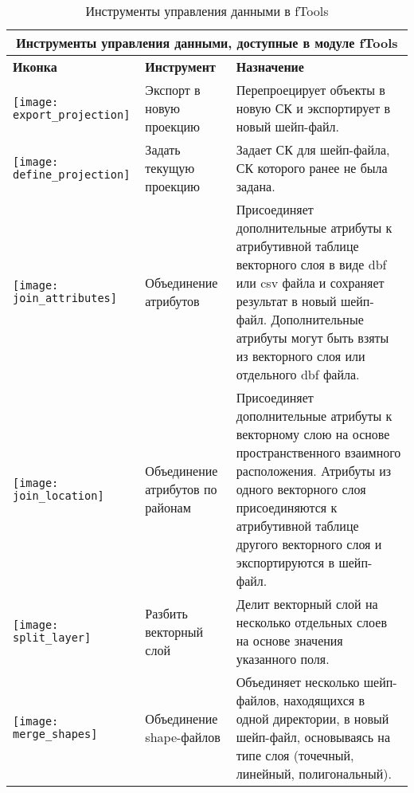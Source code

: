 \begin{table}[ht]
\centering
\begin{tabular}{|m{1cm}|m{3cm}|m{9cm}|}
 \hline \multicolumn{3}{|c|}{\textbf{Инструменты управления данными, доступные в модуле fTools}} \\
 \hline \textbf{Иконка} & \textbf{Инструмент} & \textbf{Назначение} \\
 \hline \texttt{[image: export\_projection]} & Экспорт в новую проекцию &
 Перепроецирует объекты в новую СК и экспортирует в новый шейп-файл. \\
 \hline \texttt{[image: define\_projection]} & Задать текущую проекцию &
 Задает СК для шейп-файла, СК которого ранее не была задана. \\
 \hline \texttt{[image: join\_attributes]} & Объединение атрибутов & Присоединяет
 дополнительные атрибуты к атрибутивной таблице векторного слоя в виде dbf или csv файла и
 сохраняет результат в новый шейп-файл. Дополнительные атрибуты могут быть взяты из
 векторного слоя или отдельного dbf файла. \\
 \hline \texttt{[image: join\_location]} & Объединение атрибутов по районам & Присоединяет
 дополнительные атрибуты к векторному слою на основе пространственного взаимного расположения.
 Атрибуты из одного векторного слоя присоединяются к атрибутивной таблице другого векторного слоя и
 экспортируются в шейп-файл. \\
 \hline \texttt{[image: split\_layer]} & Разбить векторный слой &
 Делит векторный слой на несколько отдельных слоев на основе значения указанного поля. \\
 \hline \texttt{[image: merge\_shapes]} & Объединение shape-файлов &
 Объединяет несколько шейп-файлов, находящихся в одной директории, в новый шейп-файл,
 основываясь на типе слоя (точечный, линейный, полигональный). \\
 \hline
\end{tabular}
\caption{Инструменты управления данными в fTools}\label{tab:fTool_data_management}
\end{table}

\FloatBarrier
